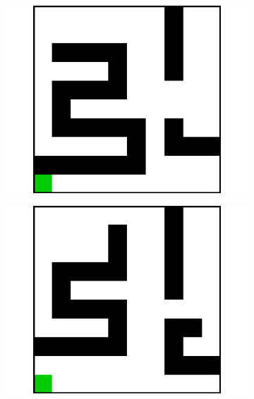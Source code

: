 \documentclass{article}
\begin{document}
\begin{figure}[t]
  \begin{subfigure}[t]{0.18\textwidth}
    \includegraphics[width=\textwidth]{images/maze/maze10.pdf}
    \caption{}
  \end{subfigure}
  \begin{subfigure}[t]{0.18\textwidth}
    \includegraphics[width=\textwidth]{images/maze/maze11.pdf}
    \caption{}
  \end{subfigure}
  \begin{subfigure}[t]{0.18\textwidth}

\end{subfigure}
\end{figure}
\end{document}
